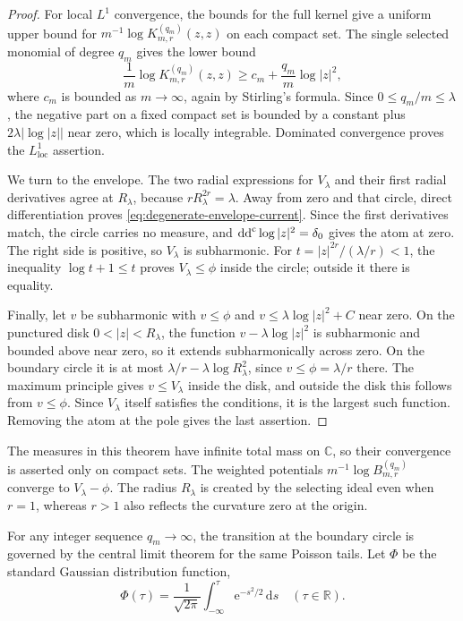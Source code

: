 \begin{proof}
For local $L^1$ convergence, the bounds for the full kernel give a uniform upper bound for $m^{-1}\log K_{m,r}^{(q_m)}(z,z)$ on each compact set. The single selected monomial of degree $q_m$ gives the lower bound
\[
 \frac1m\log K_{m,r}^{(q_m)}(z,z)
 \geq c_m+\frac{q_m}{m}\log|z|^2,
\]
where $c_m$ is bounded as $m\to\infty$, again by Stirling's formula. Since $0\leq q_m/m\leq\lambda$, the negative part on a fixed compact set is bounded by a constant plus $2\lambda|\log|z||$ near zero, which is locally integrable. Dominated convergence proves the $L^1_{\mathrm{loc}}$ assertion.

We turn to the envelope. The two radial expressions for $V_\lambda$ and their first radial derivatives agree at $R_\lambda$, because $rR_\lambda^{2r}=\lambda$. Away from zero and that circle, direct differentiation proves \eqref{eq:degenerate-envelope-current}. Since the first derivatives match, the circle carries no measure, and $\mathrm{dd}^{\mathrm{c}}\log|z|^2=\delta_0$ gives the atom at zero. The right side is positive, so $V_\lambda$ is subharmonic. For $t=|z|^{2r}/(\lambda/r)<1$, the inequality $\log t+1\leq t$ proves $V_\lambda\leq\phi$ inside the circle; outside it there is equality.

Finally, let $v$ be subharmonic with $v\leq\phi$ and $v\leq\lambda\log|z|^2+C$ near zero. On the punctured disk $0<|z|<R_\lambda$, the function $v-\lambda\log|z|^2$ is subharmonic and bounded above near zero, so it extends subharmonically across zero. On the boundary circle it is at most $\lambda/r-\lambda\log R_\lambda^2$, since $v\leq\phi=\lambda/r$ there. The maximum principle gives $v\leq V_\lambda$ inside the disk, and outside the disk this follows from $v\leq\phi$. Since $V_\lambda$ itself satisfies the conditions, it is the largest such function. Removing the atom at the pole gives the last assertion.
\end{proof}

The measures in this theorem have infinite total mass on $\mathbb C$, so their convergence is asserted only on compact sets. The weighted potentials $m^{-1}\log B_{m,r}^{(q_m)}$ converge to $V_\lambda-\phi$. The radius $R_\lambda$ is created by the selecting ideal even when $r=1$, whereas $r>1$ also reflects the curvature zero at the origin.

For any integer sequence $q_m\to\infty$, the transition at the boundary circle is governed by the central limit theorem for the same Poisson tails. Let $\Phi$ be the standard Gaussian distribution function,
\[
 \Phi(\tau)=\frac1{\sqrt{2\pi}}\int_{-\infty}^{\tau}
                        \mathrm{e}^{-s^2/2}\,\mathrm{d}s
 \quad(\tau\in\mathbb R).
\]

